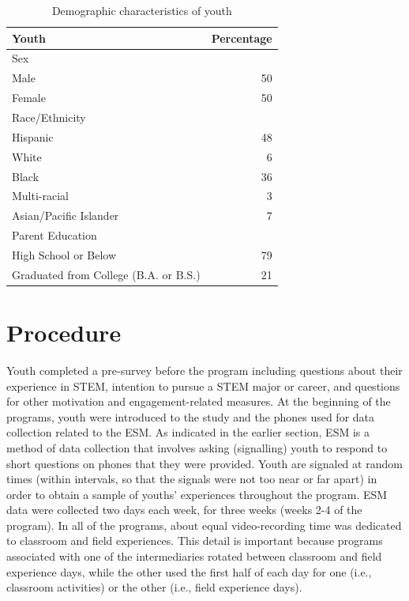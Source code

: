 \documentclass[]{msu-thesis}
\theoremstyle{definition}
\theoremstyle{definition}
\theoremstyle{definition}
\theoremstyle{remark}
\begin{document}
\begin{table}

\caption{\label{tab:unnamed-chunk-3}Demographic characteristics of youth}
\centering
\begin{tabular}[t]{lr}
\toprule
Youth & Percentage\\
\midrule
Sex & \\
Male & 50\\
Female & 50\\
Race/Ethnicity & \\
Hispanic & 48\\
\addlinespace
White & 6\\
Black & 36\\
Multi-racial & 3\\
Asian/Pacific Islander & 7\\
Parent Education & \\
\addlinespace
High School or Below & 79\\
Graduated from College (B.A. or B.S.) & 21\\
\bottomrule
\end{tabular}
\end{table}

\section{Procedure}\label{procedure}

Youth completed a pre-survey before the program including questions
about their experience in STEM, intention to pursue a STEM major or
career, and questions for other motivation and engagement-related
measures. At the beginning of the programs, youth were introduced to the
study and the phones used for data collection related to the ESM. As
indicated in the earlier section, ESM is a method of data collection
that involves asking (signalling) youth to respond to short questions on
phones that they were provided. Youth are signaled at random times
(within intervals, so that the signals were not too near or far apart)
in order to obtain a sample of youths' experiences throughout the
program. ESM data were collected two days each week, for three weeks
(weeks 2-4 of the program). In all of the programs, about equal
video-recording time was dedicated to classroom and field experiences.
This detail is important because programs associated with one of the
intermediaries rotated between classroom and field experience days,
while the other used the first half of each day for one (i.e., classroom
activities) or the other (i.e., field experience days).
\end{document}
